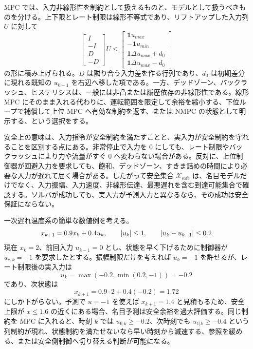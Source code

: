 MPC では、入力非線形性を制約として扱えるものと、モデルとして扱うべきものを分ける。上下限とレート制限は線形不等式であり、リフトアップした入力列 $U$ に対して
\begin{equation}
  \begin{bmatrix}
    I\\-I\\D\\-D
  \end{bmatrix}U
  \le
  \begin{bmatrix}
    \mathbf{1}u_{max}\\-\mathbf{1}u_{min}\\
    \mathbf{1}\Delta u_{max}+d_0\\
    \mathbf{1}\Delta u_{max}-d_0
  \end{bmatrix}
\end{equation}
の形に積み上げられる。$D$ は隣り合う入力差を作る行列であり、$d_0$ は初期差分に現れる既知の $u_{k-1}$ を右辺へ移した項である。一方、デッドゾーン、バックラッシュ、ヒステリシスは、一般には非凸または履歴依存の非線形性である。線形 MPC にそのまま入れる代わりに、運転範囲を限定して余裕を縮小する、下位ループで補償して上位 MPC へ有効な制約を返す、または NMPC の状態として明示する、という選択をする。

安全上の意味は、入力指令が安全制約を満たすことと、実入力が安全制約を守れることを区別する点にある。非常停止で入力を 0 にしても、レート制限やバックラッシュにより力や流量がすぐ 0 へ変わらない場合がある。反対に、上位制御器が回避入力を要求しても、飽和、デッドゾーン、すきま詰めの時間により必要な入力が遅れて届く場合がある。したがって安全集合 $\mathcal{X}_{\mathrm{safe}}$ は、名目モデルだけでなく、入力振幅、入力速度、非線形伝達、最悪遅れを含む到達可能集合で確認する。ソルバが成功しても、実入力が予測入力と異なるなら、その成功は安全保証にならない。

一次遅れ温度系の簡単な数値例を考える。
\begin{equation}
  x_{k+1}=0.9x_k+0.4u_k,
  \qquad
  \left|u_k\right|\le1,
  \qquad
  \left|u_k-u_{k-1}\right|\le0.2
\end{equation}
現在 $x_k=2$、前回入力 $u_{k-1}=0$ とし、状態を早く下げるために制御器が $u_{c,k}=-1$ を要求したとする。振幅制限だけを考えれば $u_k=-1$ を許せるが、レート制限後の実入力は
\begin{equation}
  u_k=\max(-0.2,\min(0.2,-1))=-0.2
\end{equation}
であり、次状態は
\begin{equation}
  x_{k+1}=0.9\cdot2+0.4(-0.2)=1.72
\end{equation}
にしか下がらない。予測で $u=-1$ を使えば $x_{k+1}=1.4$ と見積もるため、安全上限が $x\le1.6$ の近くにある場合、名目予測は安全余裕を過大評価する。同じ制約を MPC に入れると、時刻 $k$ では $u_{0|k}\ge-0.2$、次時刻でも $u_{1|k}\ge-0.4$ という列制約が現れ、状態制約を満たせないなら早い時刻から減速する、参照を緩める、または安全側制御へ切り替える判断が可能になる。

